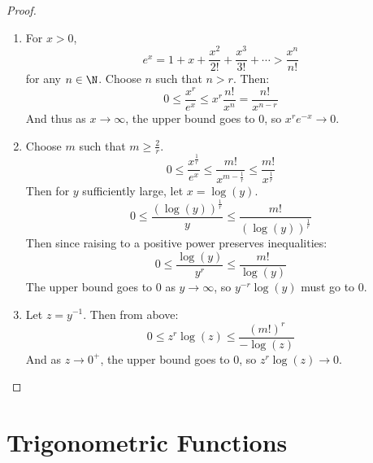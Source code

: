 \documentclass[../Main.tex]{subfiles}
\begin{document}
\begin{proof}
    \begin{enumerate}
        \item For $x > 0$,
            \begin{equation*}
                e^x = 1 + x + \frac{x^2}{2!} + \frac{x^3}{3!} + \cdots > \frac{x^n}{n!}
            \end{equation*}
            for any $n \in \N$. Choose $n$ such that $n > r$. Then:
            \begin{equation*}
                0 \leq \frac{x^r}{e^x} \leq x^r \frac{n!}{x^n} = \frac{n!}{x^{n-r}}
            \end{equation*}
            And thus as $x \to \infty$, the upper bound goes to $0$, so $x^r e^{-x} \to 0$.
        \item Choose $m$ such that $m \geq \frac{2}{r}$.
            \begin{equation*}
                0 \leq \frac{x^{\frac{1}{r}}}{e^x} \leq \frac{m!}{x^{m - \frac{1}{r}}} \leq \frac{m!}{x^{\frac{1}{r}}}
            \end{equation*}
            Then for $y$ sufficiently large, let $x = \log(y)$.
            \begin{equation*}
                0 \leq \frac{(\log(y))^\frac{1}{r}}{y} \leq \frac{m!}{(\log(y))^\frac{1}{r}}
            \end{equation*}
            Then since raising to a positive power preserves inequalities:
            \begin{equation*}
                0 \leq \frac{\log(y)}{y^r} \leq \frac{m!}{\log(y)}
            \end{equation*}
            The upper bound goes to $0$ as $y \to \infty$, so $y^{-r} \log(y)$ must go to $0$.
        \item Let $z = y^{-1}$. Then from above:
            \begin{equation*}
                0 \leq z^r \log(z) \leq \frac{(m!)^r}{-\log(z)}
            \end{equation*}
            And as $z \to 0^+$, the upper bound goes to $0$, so $z^r \log(z) \to 0$.
    \end{enumerate}
\end{proof}
\section{Trigonometric Functions}
\end{document}
